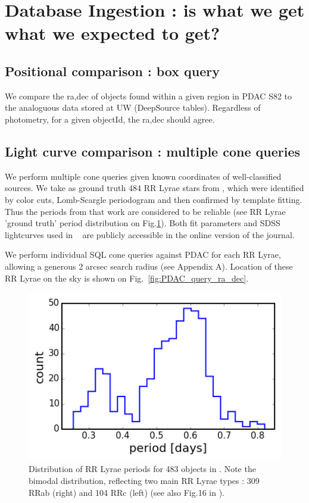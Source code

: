 \documentclass[fleqn,usenatbib]{mnras} %
\begin{document}
\section{Database Ingestion : is what we get what we expected to get? }
\label{sec:dg}


\subsection{Positional comparison : box query }

We compare the ra,dec of objects found within  a given region in PDAC S82 to the analoguous data stored at UW (DeepSource tables). Regardless of photometry, for a given objectId, the ra,dec should agree.  


\subsection{Light curve comparison : multiple cone queries }
\label{sec:rr_lyrae}

We perform multiple cone queries given known coordinates of well-classified sources.  We take as ground truth  484 RR Lyrae stars from   \cite{sesar2010} , which were identified by color cuts, Lomb-Scargle periodogram and then confirmed by template fitting.  Thus the periods from that work are considered to be reliable (see  RR Lyrae 'ground truth'  period distribution on Fig.\ref{fig:RRLyr_distribution}). Both fit parameters and  SDSS lightcurves used in ~\cite{sesar2010}  are publicly accessible in the online version of the journal.

We perform individual SQL  cone queries  against PDAC for each RR Lyrae, allowing a generous 2 arcsec search radius (see Appendix A). Location of these RR Lyrae on the sky is shown on Fig.~\ref{fig:PDAC_query_ra_dec}. 

\begin{figure}
\includegraphics[width=\columnwidth]{figs/Fig_1_Sesar_2010_RRLyr}
\caption{ Distribution of RR Lyrae periods  for 483 objects in \citep{sesar2010}. Note the bimodal distribution, reflecting two main RR Lyrae types : 309 RRab (right) and 104 RRc (left) (see also Fig.16 in \citep{sesar2010}).}
\label{fig:RRLyr_distribution}
\end{figure}
\end{document}

